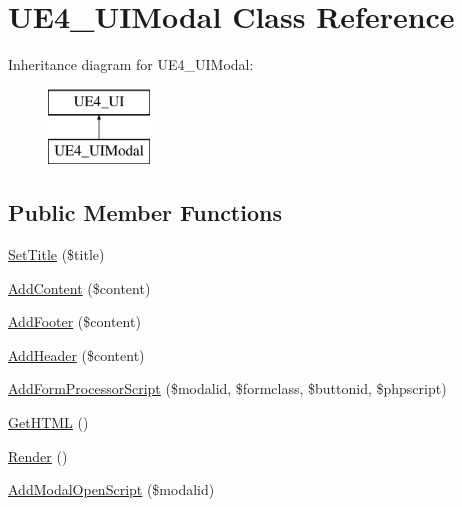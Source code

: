 \hypertarget{class_u_e4___u_i_modal}{\section{U\-E4\-\_\-\-U\-I\-Modal Class Reference}
\label{class_u_e4___u_i_modal}
}
Inheritance diagram for U\-E4\-\_\-\-U\-I\-Modal\-:\begin{figure}[H]
\begin{center}
\leavevmode
\includegraphics[height=2.000000cm]{class_u_e4___u_i_modal}
\end{center}
\end{figure}
\subsection*{Public Member Functions}
\begin{DoxyCompactItemize}
\item 
\hyperlink{class_u_e4___u_i_modal_a9c1514ac8c26ee21b28f2fbef435fa47}{Set\-Title} (\$title)
\item 
\hyperlink{class_u_e4___u_i_modal_a7fd6d1b0467b34de443953e2be12f13a}{Add\-Content} (\$content)
\item 
\hyperlink{class_u_e4___u_i_modal_aa5a098da1bd7b2c82ab99d9109d6ec49}{Add\-Footer} (\$content)
\item 
\hyperlink{class_u_e4___u_i_modal_a728d47dc8dffe39b76d0feb6491b437c}{Add\-Header} (\$content)
\item 
\hyperlink{class_u_e4___u_i_modal_a2c58a53b3c7f41fbfb757123765a538d}{Add\-Form\-Processor\-Script} (\$modalid, \$formclass, \$buttonid, \$phpscript)
\item 
\hyperlink{class_u_e4___u_i_modal_abc99f9ea27a455eed49d783d5e03c4ad}{Get\-H\-T\-M\-L} ()
\item 
\hyperlink{class_u_e4___u_i_modal_a1a6915de89093bc6383d7c1f18ab81e2}{Render} ()
\item 
\hyperlink{class_u_e4___u_i_modal_a3c78c14fcc997b83f23678d4d354e080}{Add\-Modal\-Open\-Script} (\$modalid)
\end{DoxyCompactItemize}


